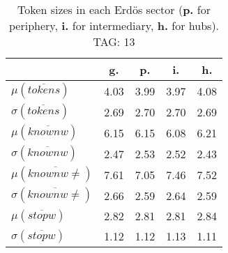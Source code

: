\begin{table}[h!]
\begin{center}
\begin{tabular}{| l | c | c | c | c |}\hline
 & g. & p. & i. & h. \\\hline
$\mu(\overline{tokens})$ & 4.03  & 3.99  & 3.97  & 4.08 \\\hline
$\sigma(\overline{tokens})$ & 2.69  & 2.70  & 2.70  & 2.69 \\\hline
$\mu(\overline{knownw})$ & 6.15  & 6.15  & 6.08  & 6.21 \\\hline
$\sigma(\overline{knownw})$ & 2.47  & 2.53  & 2.52  & 2.43 \\\hline
$\mu(\overline{knownw \neq})$ & 7.61  & 7.05  & 7.46  & 7.52 \\\hline
$\sigma(\overline{knownw \neq})$ & 2.66  & 2.59  & 2.64  & 2.59 \\\hline
$\mu(\overline{stopw})$ & 2.82  & 2.81  & 2.81  & 2.84 \\\hline
$\sigma(\overline{stopw})$ & 1.12  & 1.12  & 1.13  & 1.11 \\\hline
\end{tabular}
\caption{Token sizes in each Erd\"os sector ({{\bf p.}} for periphery, {{\bf i.}} for intermediary, {{\bf h.}} for hubs). TAG: 13}
\end{center}
\end{table}